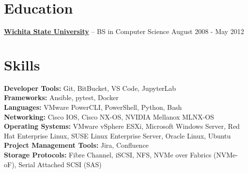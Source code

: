 \documentclass[11pt]{article}       %
\begin{document}
\vspace{-18.5pt}

\section*{Education}
\textbf{\href{https://www.wichita.edu}{Wichita State University}} -- BS in Computer Science \hfill August 2008 - May 2012




\section*{Skills}
\textbf{Developer Tools:} Git, BitBucket, VS Code, JupyterLab \\
\textbf{Frameworks:} Ansible, pytest, Docker \\
\textbf{Languages:} VMware PowerCLI, PowerShell, Python, Bash \\
\textbf{Networking:} Cisco IOS, Cisco NX-OS, NVIDIA Mellanox MLNX-OS \\
\textbf{Operating Systems:} VMware vSphere ESXi, Microsoft Windows Server, Red Hat Enterprise Linux, SUSE Linux Enterprise Server, Oracle Linux, Ubuntu \\
\textbf{Project Management Tools:} Jira, Confluence \\
\textbf{Storage Protocols:} Fibre Channel, iSCSI, NFS, NVMe over Fabrics (NVMe-oF), Serial Attached SCSI (SAS)

\vspace{-6.5pt}
\end{document}
